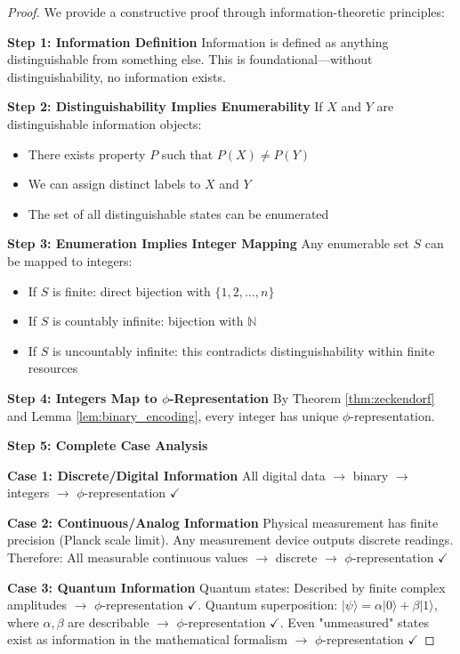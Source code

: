 \documentclass[12pt,letterpaper]{article}
\begin{document}
\begin{proof}
We provide a constructive proof through information-theoretic principles:

\textbf{Step 1: Information Definition}
Information is defined as anything distinguishable from something else. This is foundational—without distinguishability, no information exists.

\textbf{Step 2: Distinguishability Implies Enumerability}
If $X$ and $Y$ are distinguishable information objects:
\begin{itemize}
\item There exists property $P$ such that $P(X) \neq P(Y)$
\item We can assign distinct labels to $X$ and $Y$
\item The set of all distinguishable states can be enumerated
\end{itemize}

\textbf{Step 3: Enumeration Implies Integer Mapping}
Any enumerable set $S$ can be mapped to integers:
\begin{itemize}
\item If $S$ is finite: direct bijection with $\{1, 2, \ldots, n\}$
\item If $S$ is countably infinite: bijection with $\mathbb{N}$
\item If $S$ is uncountably infinite: this contradicts distinguishability within finite resources
\end{itemize}

\textbf{Step 4: Integers Map to $\phi$-Representation}
By Theorem \ref{thm:zeckendorf} and Lemma \ref{lem:binary_encoding}, every integer has unique $\phi$-representation.

\textbf{Step 5: Complete Case Analysis}

\textbf{Case 1: Discrete/Digital Information}
All digital data $\to$ binary $\to$ integers $\to$ $\phi$-representation $\checkmark$

\textbf{Case 2: Continuous/Analog Information}
Physical measurement has finite precision (Planck scale limit). Any measurement device outputs discrete readings. Therefore: All measurable continuous values $\to$ discrete $\to$ $\phi$-representation $\checkmark$

\textbf{Case 3: Quantum Information}
Quantum states: Described by finite complex amplitudes $\to$ $\phi$-representation $\checkmark$. Quantum superposition: $|\psi\rangle = \alpha|0\rangle + \beta|1\rangle$, where $\alpha,\beta$ are describable $\to$ $\phi$-representation $\checkmark$. Even "unmeasured" states exist as information in the mathematical formalism $\to$ $\phi$-representation $\checkmark$


\end{proof}
\end{document}
